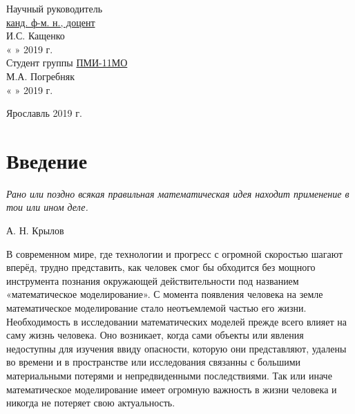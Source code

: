 \documentclass[12pt, a4paper]{extarticle}
\numberwithin{equation}{section}
\begin{document}
\begin{flushright} 
	Научный руководитель\\ 
	\underline{\phantom{aaa}канд. ф-м. н., доцент\phantom{aaa}}\\ 
	\vspace{0.1cm} 
	\underline{\phantom{aaaaaaaaaaaaa}} И.С. Кащенко\\ 
	« 
	\underline{\phantom{aaa}} 
	» 
	\underline{\phantom{aaaaaaaaaaaaa}} 2019 г.\\ 
	\vspace{0.5cm} 
	Студент группы \underline{\phantom{a}ПМИ-11МО\phantom{a}}\\ 
	\vspace{0.1cm} 
	\underline{\phantom{aaaaaaaaaaaaa}} М.А. Погребняк\\ 
	« 
	\underline{\phantom{aaa}} 
	» 
	\underline{\phantom{aaaaaaaaaaaaaa}}2019 г.\\ 
	\vspace{3cm}
\end{flushright} 
\begin{center} 
	Ярославль 2019 г.
	\vspace{-1cm}  
\end{center} 


\justify 
\setlength{\parindent}{1.25cm} 
\newpage 
\thispagestyle{empty} 
\setcounter{page}{2} 

\newpage

\setcounter{page}{2}

\tableofcontents 
\newpage 

\section*{Введение}
\epigraph{\textit{Рано или поздно всякая правильная математическая идея находит применение в тои или ином деле.}}
{А. Н. Крылов}
В современном мире, где технологии и прогресс с огромной скоростью шагают вперёд, трудно представить, как человек смог бы обходится без мощного инструмента познания окружающей действительности под названием «математическое моделирование». С момента появления человека на земле математическое моделирование стало неотъемлемой частью его жизни. Необходимость в исследовании математических моделей прежде всего влияет на саму жизнь человека. Оно возникает, когда сами объекты или явления недоступны для изучения ввиду опасности, которую они представляют, удалены во времени и в пространстве или исследования связанны с большими материальными потерями и непредвиденными последствиями. Так или иначе математическое моделирование имеет огромную важность в жизни человека и никогда не потеряет свою актуальность.
\end{document}
